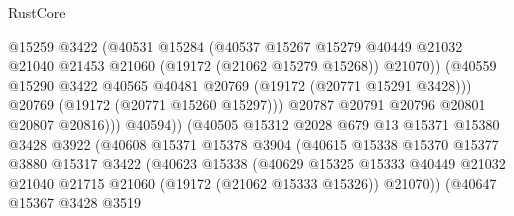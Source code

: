 \begin{lexlean}{RustCore}
\begin{coremodule}
                                  @15259
                                  @3422
                                  (@40531
                                    @15284
                                    (@40537
                                      @15267
                                      @15279
                                      @40449
                                      @21032
                                      @21040
                                      @21453
                                      @21060
                                      (@19172 (@21062 @15279 @15268))
                                      @21070))
                                  (@40559
                                    @15290
                                    @3422
                                    @40565
                                    @40481
                                    @20769
                                    (@19172 (@20771 @15291 @3428)))
                                  @20769
                                  (@19172 (@20771 @15260 @15297)))
                                @20787
                                @20791
                                @20796
                                @20801
                                @20807
                                @20816)))
                          @40594))
                      (@40505
                        @15312
                        @2028
                        @679
                        @13
                        @15371
                        @15380
                        @3428
                        @3922
                        (@40608
                          @15371
                          @15378
                          @3904
                          (@40615
                            @15338
                            @15370
                            @15377
                            @3880
                            @15317
                            @3422
                            (@40623
                              @15338
                              (@40629
                                @15325
                                @15333
                                @40449
                                @21032
                                @21040
                                @21715
                                @21060
                                (@19172 (@21062 @15333 @15326))
                                @21070))
                            (@40647
                              @15367
                              @3428
                              @3519

\end{coremodule}
\end{lexlean}
